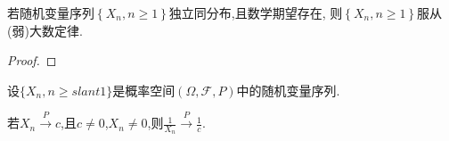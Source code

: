 \documentclass[lang=cn,newtx,10pt,scheme=chinese]{../../Template/elegantbook}
\begin{document}
\begin{theorem}[Khinchin大数定律]\label{theorem:Khinchin大数定律}
    若随机变量序列$\left\{ X_n,n\ge 1 \right\}$独立同分布,且数学期望存在,
    则$\left\{ X_n,n\ge 1 \right\}$服从(弱)大数定律.
\end{theorem}
\begin{proof}
    
\end{proof}

\begin{theorem}[依概率收敛的性质]\label{theorem:依概率收敛的性质}
    设\(\{ X_n, n \geqslant slant 1\}\)是概率空间\((\varOmega, \mathcal{F}, P)\)中的随机变量序列.

若\(X_n \overset{P}{\rightarrow} c\),且\(c \neq 0\),\(X_n \neq 0\),则\(\frac{1}{X_n} \overset{P}{\rightarrow} \frac{1}{c}\).
\end{theorem}
\end{document}
